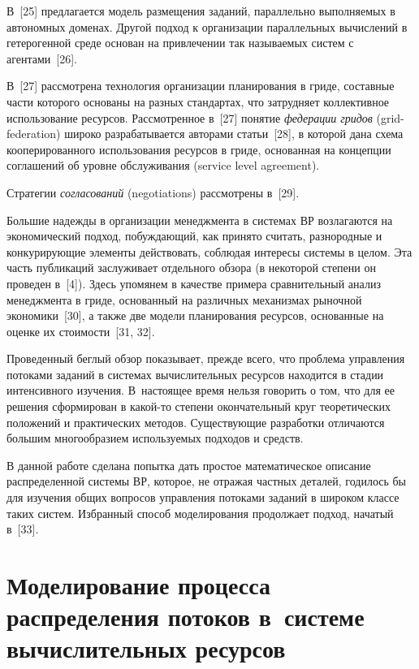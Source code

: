 \begin{multicols}{2}
  В~[25] предлагается модель размещения заданий, параллельно выполняемых в 
автономных доменах. Другой подход к организации параллельных вы\-чис\-ле\-ний в 
гетерогенной среде основан на привлечении так называемых систем с агентами~[26].

 В~[27] 
рассмотрена технология организации планиро\-вания в гриде, составные части которого 
основаны на разных стандартах, что затрудняет коллективное использование ресурсов. 
Рассмотренное в~[27] понятие \textit{федерации гридов} (grid-federation) 
широко разрабатывается авторами статьи~[28], в которой дана схема кооперированного 
использования ресурсов в гриде, основанная на концепции соглашений об уровне 
обслуживания (service level agreement). 

Стратегии \textit{согласований} (negotiations) 
рассмотрены в~[29].
  
  Большие надежды в организации менеджмента в системах ВР возлагаются на 
экономический подход, побуждающий, как принято считать, разнородные и конкурирующие 
элементы действовать, соблюдая интересы системы в целом. Эта часть публикаций 
заслуживает отдельного обзора (в некоторой степени он проведен в~[4]). Здесь упомянем в 
качестве примера сравнительный анализ менеджмента в гриде, основанный на различных 
механизмах рыночной экономики~[30], а также две модели планирования ресурсов, 
основанные на оценке их стоимости~[31, 32].
  
  Проведенный беглый обзор показывает, прежде всего, что проблема управления потоками 
заданий в системах вычислительных ресурсов находится в стадии интенсивного изучения. 
В~настоящее время нельзя говорить о том, что для ее решения сформирован в какой-то 
степени окончательный круг теоретических положений и практических методов. 
Существующие разработки отличаются большим многообразием используемых подходов и 
средств.
{

}
  
  В данной работе сделана попытка дать простое математическое описание распределенной 
системы ВР, которое, не отражая частных деталей, годилось бы для изучения общих 
вопросов управления потоками заданий в широком классе таких систем. Избранный способ 
моделирования продолжает подход, начатый в~[33].

\section{Моделирование процесса распределения потоков в~системе 
вычислительных ресурсов}


\end{multicols}
